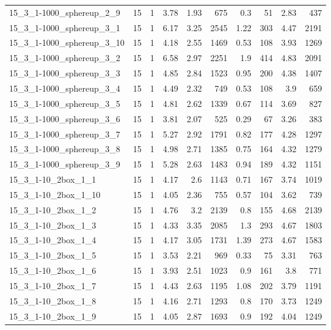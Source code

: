 \begin{center}
\begin{scriptsize}
\begin{longtable}{lrrrrrrrrr}
15\_3\_1-1000\_sphereup\_2\_9 & 15 & 1 & 3.78 & 1.93 & 675 & 0.3 & 51 & 2.83 & 437\\
15\_3\_1-1000\_sphereup\_3\_1 & 15 & 1 & 6.17 & 3.25 & 2545 & 1.22 & 303 & 4.47 & 2191\\
15\_3\_1-1000\_sphereup\_3\_10 & 15 & 1 & 4.18 & 2.55 & 1469 & 0.53 & 108 & 3.93 & 1269\\
15\_3\_1-1000\_sphereup\_3\_2 & 15 & 1 & 6.58 & 2.97 & 2251 & 1.9 & 414 & 4.83 & 2091\\
15\_3\_1-1000\_sphereup\_3\_3 & 15 & 1 & 4.85 & 2.84 & 1523 & 0.95 & 200 & 4.38 & 1407\\
15\_3\_1-1000\_sphereup\_3\_4 & 15 & 1 & 4.49 & 2.32 & 749 & 0.53 & 108 & 3.9 & 659\\
15\_3\_1-1000\_sphereup\_3\_5 & 15 & 1 & 4.81 & 2.62 & 1339 & 0.67 & 114 & 3.69 & 827\\
15\_3\_1-1000\_sphereup\_3\_6 & 15 & 1 & 3.81 & 2.07 & 525 & 0.29 & 67 & 3.26 & 383\\
15\_3\_1-1000\_sphereup\_3\_7 & 15 & 1 & 5.27 & 2.92 & 1791 & 0.82 & 177 & 4.28 & 1297\\
15\_3\_1-1000\_sphereup\_3\_8 & 15 & 1 & 4.98 & 2.71 & 1385 & 0.75 & 164 & 4.32 & 1279\\
15\_3\_1-1000\_sphereup\_3\_9 & 15 & 1 & 5.28 & 2.63 & 1483 & 0.94 & 189 & 4.32 & 1151\\
15\_3\_1-10\_2box\_1\_1 & 15 & 1 & 4.17 & 2.6 & 1143 & 0.71 & 167 & 3.74 & 1019\\
15\_3\_1-10\_2box\_1\_10 & 15 & 1 & 4.05 & 2.36 & 755 & 0.57 & 104 & 3.62 & 739\\
15\_3\_1-10\_2box\_1\_2 & 15 & 1 & 4.76 & 3.2 & 2139 & 0.8 & 155 & 4.68 & 2139\\
15\_3\_1-10\_2box\_1\_3 & 15 & 1 & 4.33 & 3.35 & 2085 & 1.3 & 293 & 4.67 & 1803\\
15\_3\_1-10\_2box\_1\_4 & 15 & 1 & 4.17 & 3.05 & 1731 & 1.39 & 273 & 4.67 & 1583\\
15\_3\_1-10\_2box\_1\_5 & 15 & 1 & 3.53 & 2.21 & 969 & 0.33 & 75 & 3.31 & 763\\
15\_3\_1-10\_2box\_1\_6 & 15 & 1 & 3.93 & 2.51 & 1023 & 0.9 & 161 & 3.8 & 771\\
15\_3\_1-10\_2box\_1\_7 & 15 & 1 & 4.43 & 2.63 & 1195 & 1.08 & 202 & 3.79 & 1191\\
15\_3\_1-10\_2box\_1\_8 & 15 & 1 & 4.16 & 2.71 & 1293 & 0.8 & 170 & 3.73 & 1249\\
15\_3\_1-10\_2box\_1\_9 & 15 & 1 & 4.05 & 2.87 & 1693 & 0.9 & 192 & 4.04 & 1249\\

\end{longtable}
\end{scriptsize}
\end{center}
